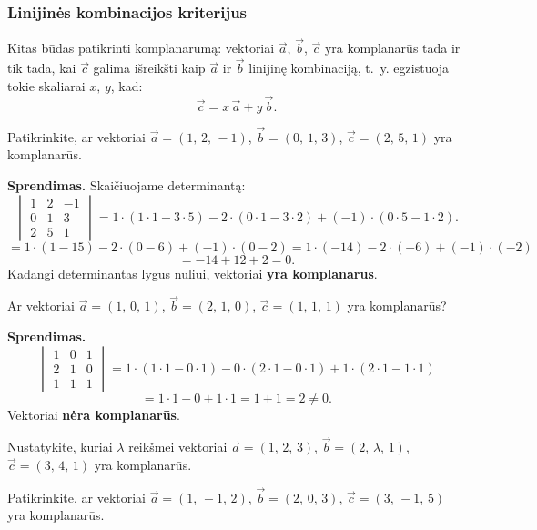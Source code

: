 \subsubsection{Linijinės kombinacijos kriterijus}

Kitas būdas patikrinti komplanarumą: vektoriai $\vec{a}$, $\vec{b}$, $\vec{c}$ yra komplanarūs tada ir tik tada, kai $\vec{c}$ galima išreikšti kaip $\vec{a}$ ir $\vec{b}$ linijinę kombinaciją, t.~y. egzistuoja tokie skaliarai $x,\, y$, kad:
\[
\vec{c} = x\,\vec{a} + y\,\vec{b}.
\]

\begin{example}
Patikrinkite, ar vektoriai $\vec{a} = (1,\, 2,\, -1)$, $\vec{b} = (0,\, 1,\, 3)$, $\vec{c} = (2,\, 5,\, 1)$ yra komplanarūs.

\textbf{Sprendimas.} Skaičiuojame determinantą:
\[
\begin{vmatrix}
1 & 2 & -1 \\
0 & 1 & 3 \\
2 & 5 & 1
\end{vmatrix}
= 1\cdot(1\cdot1 - 3\cdot5) - 2\cdot(0\cdot1 - 3\cdot2) + (-1)\cdot(0\cdot5 - 1\cdot2).
\]
\[
= 1\cdot(1 - 15) - 2\cdot(0 - 6) + (-1)\cdot(0 - 2)
= 1\cdot(-14) - 2\cdot(-6) + (-1)\cdot(-2)
\]
\[
= -14 + 12 + 2 = 0.
\]
Kadangi determinantas lygus nuliui, vektoriai \textbf{yra komplanarūs}.
\end{example}

\begin{example}
Ar vektoriai $\vec{a} = (1,\, 0,\, 1)$, $\vec{b} = (2,\, 1,\, 0)$, $\vec{c} = (1,\, 1,\, 1)$ yra komplanarūs?

\textbf{Sprendimas.}
\[
\begin{vmatrix}
1 & 0 & 1 \\
2 & 1 & 0 \\
1 & 1 & 1
\end{vmatrix}
= 1\cdot(1\cdot1 - 0\cdot1) - 0\cdot(2\cdot1 - 0\cdot1) + 1\cdot(2\cdot1 - 1\cdot1)
\]
\[
= 1\cdot1 - 0 + 1\cdot1 = 1 + 1 = 2 \neq 0.
\]
Vektoriai \textbf{nėra komplanarūs}.
\end{example}

\begin{exercise}
Nustatykite, kuriai $\lambda$ reikšmei vektoriai $\vec{a} = (1,\, 2,\, 3)$, $\vec{b} = (2,\, \lambda,\, 1)$, $\vec{c} = (3,\, 4,\, 1)$ yra komplanarūs.
\end{exercise}

\begin{exercise}
Patikrinkite, ar vektoriai $\vec{a} = (1,\, -1,\, 2)$, $\vec{b} = (2,\, 0,\, 3)$, $\vec{c} = (3,\, -1,\, 5)$ yra komplanarūs.
\end{exercise}

